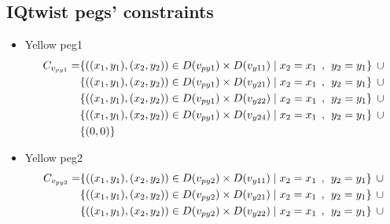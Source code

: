 \begin{appendices}
\section{IQtwist pegs' constraints}
\label{appendix:2Dpegs}
\begin{itemize}
  \item Yellow peg1\\
  \begin{align*}  
C_{v_{py1}} = &\{((x_{1},y_{1}),(x_{2},y_{2}))\in D(v_{py1}) \times D(v_{y11})\mid x_{2} = x_{1} \hspace{1ex} , \hspace{1ex}  y_{2} = y_{1}\}\hspace{1ex} \cup  
\\&\{((x_{1},y_{1}),(x_{2},y_{2}))\in D(v_{py1}) \times D(v_{y21})\mid x_{2} = x_{1} \hspace{1ex} , \hspace{1ex}  y_{2} = y_{1}\}\hspace{1ex} \cup 
\\&\{ ((x_{1},y_{1}),(x_{2},y_{2}))\in D(v_{py1}) \times D(v_{y22})\mid x_{2} = x_{1} \hspace{1ex} , \hspace{1ex}  y_{2} = y_{1}\}\hspace{1ex}\cup 
\\& \{((x_{1},y_{1}),(x_{2},y_{2}))\in D(v_{py1}) \times D(v_{y24})\mid x_{2} = x_{1} \hspace{1ex} , \hspace{1ex}  y_{2} = y_{1}\} \hspace{1ex}\cup
\\& \{(0,0)\}
\end{align*}
  \item Yellow peg2\\
  \begin{align*}
\Constraint{py2} = &\{((x_{1},y_{1}),(x_{2},y_{2}))\in \Domain{py2} \times \Domain{y11}\mid x_{2} = x_{1} \hspace{1ex} , \hspace{1ex}  y_{2} = y_{1}\} \hspace{1ex} \cup 
\\& \{((x_{1},y_{1}),(x_{2},y_{2}))\in \Domain{py2} \times \Domain{y21}\mid x_{2} = x_{1} \hspace{1ex} , \hspace{1ex}  y_{2} = y_{1}\} \hspace{1ex} \cup 
\\& \{ ((x_{1},y_{1}),(x_{2},y_{2}))\in \Domain{py2} \times \Domain{y22}\mid x_{2} = x_{1} \hspace{1ex} , \hspace{1ex}  y_{2} = y_{1}\} \hspace{1ex} \cup 

\end{align*}
\end{itemize}
\end{appendices}
